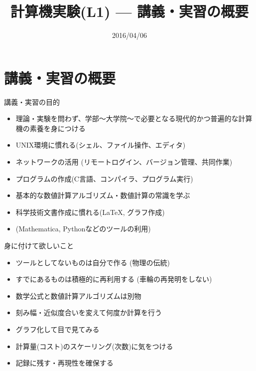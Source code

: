 \documentclass[dvipdfmx]{beamer}
\title{計算機実験(L1) --- 講義・実習の概要}
\date{2016/04/06}
\begin{document}

\begin{frame}
  \titlepage
  \tableofcontents
\end{frame}

\section{講義・実習の概要}

\begin{frame}[t]{講義・実習の目的}
  \begin{itemize}
  \item 理論・実験を問わず、学部〜大学院〜で必要となる現代的かつ普遍的な計算機の素養を身につける
  \item UNIX環境に慣れる(シェル、ファイル操作、エディタ)
  \item ネットワークの活用 (リモートログイン、バージョン管理、共同作業)
  \item プログラムの作成(C言語、コンパイラ、プログラム実行)
  \item 基本的な数値計算アルゴリズム・数値計算の常識を学ぶ
  \item 科学技術文書作成に慣れる(\LaTeX, グラフ作成)
  \item (Mathematica, Pythonなどのツールの利用)
  \end{itemize}
\end{frame}

\begin{frame}[t]{身に付けて欲しいこと}
  \begin{itemize}
  \item ツールとしてないものは自分で作る (物理の伝統)
  \item すでにあるものは積極的に再利用する (車輪の再発明をしない)
  \item 数学公式と数値計算アルゴリズムは別物
  \item 刻み幅・近似度合いを変えて何度か計算を行う
  \item グラフ化して目で見てみる
  \item 計算量(コスト)のスケーリング(次数)に気をつける
  \item 記録に残す・再現性を確保する
  \end{itemize}
\end{frame}
\end{document}
